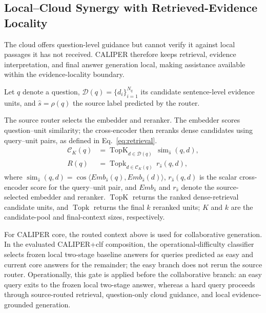 \documentclass[a4paper,fleqn]{cas-dc}
\begin{document}
\subsection{Local--Cloud Synergy with Retrieved-Evidence Locality}
The cloud offers question-level guidance but cannot verify it against local passages it has not received. CALIPER therefore keeps retrieval, evidence interpretation, and final answer generation local, making assistance available within the evidence-locality boundary.

Let \(q\) denote a question, \(\mathcal{D}(q)=\{d_i\}_{i=1}^{N_q}\) its candidate sentence-level evidence units, and \(\hat{s}=\rho(q)\) the source label predicted by the router.

\begingroup
{}
The source router selects the embedder and reranker. The embedder scores question--unit similarity; the cross-encoder then reranks dense candidates using query--unit pairs, as defined in Eq.~\eqref{eq:retrieval}.
\begin{equation}\label{eq:retrieval}
\begin{aligned}
\mathcal{C}_K(q)&=\operatorname{TopK}_{d\in\mathcal{D}(q)}\,\operatorname{sim}_{\hat{s}}(q,d),\\
R(q)&=\operatorname{Topk}_{d\in\mathcal{C}_K(q)}\,r_{\hat{s}}(q,d),
\end{aligned}
\end{equation}
where \(\operatorname{sim}_{\hat{s}}(q,d)=\cos\langle Emb_{\hat{s}}(q),Emb_{\hat{s}}(d)\rangle\), \(r_{\hat{s}}(q,d)\) is the scalar cross-encoder score for the query--unit pair, and \(Emb_{\hat{s}}\) and \(r_{\hat{s}}\) denote the source-selected embedder and reranker. \(\operatorname{TopK}\) returns the ranked dense-retrieval candidate units, and \(\operatorname{Topk}\) returns the final \(k\) reranked units; \(K\) and \(k\) are the candidate-pool and final-context sizes, respectively.
\par\endgroup

For CALIPER core, the routed context above is used for collaborative generation. In the evaluated CALIPER+clf composition, the operational-difficulty classifier selects frozen local two-stage baseline answers for queries predicted as easy and current core answers for the remainder; the easy branch does not rerun the source router. Operationally, this gate is applied before the collaborative branch: an easy query exits to the frozen local two-stage answer, whereas a hard query proceeds through source-routed retrieval, question-only cloud guidance, and local evidence-grounded generation.
\end{document}

